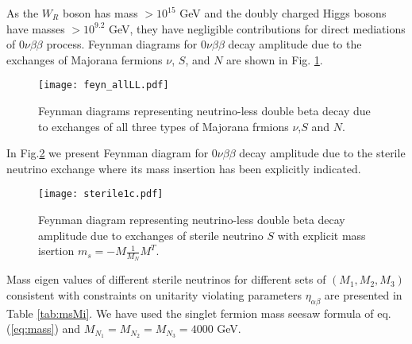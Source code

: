 \documentclass[a4paper,11pt]{article}
\begin{document}
As the $W_R$ boson has mass $> 10^{15}$ GeV   and the doubly charged Higgs bosons
have masses $> 10^{9.2}$ GeV, they have negligible contributions for direct mediations of $0\nu\beta\beta$ process.
 Feynman diagrams for
$0\nu\beta\beta$ decay amplitude due to the exchanges of Majorana
fermions $\nu$, $S$, and $N$ are shown in Fig. \ref{fig:feynall}.
\begin{figure}[htbp]
 \texttt{[image: feyn\_allLL.pdf]}
 \caption{Feynman diagrams representing neutrino-less double beta
   decay due to
exchanges of all three types of  Majorana frmions $\nu$,$S$ and $N$.}   
\label{fig:feynall}
\end{figure}
In Fig.\ref{fig:feyns} we present  Feynman diagram for
$0\nu\beta\beta$ decay amplitude due to the sterile neutrino  exchange 
where its mass insertion has been explicitly indicated.
\begin{figure}[htbp]
 \texttt{[image: sterile1c.pdf]}
 \caption{Feynman diagram representing neutrino-less double beta
   decay amplitude due to
exchanges of sterile neutrino $S$ with explicit mass isertion $m_s=-M\frac{1}{M_N}M^T$.}   
\label{fig:feyns}
\end{figure}
Mass eigen values of different sterile neutrinos for different sets of 
 $(M_1,M_2,M_3)$ consistent  with constraints on unitarity violating parameters 
$\eta_{\alpha \beta}$ are presented in Table \ref{tab:msMi}. We have
used the singlet fermion  mass seesaw formula of eq.(\ref{eq:mass})
and $M_{N_1}=M_{N_2}=M_{N_3}= 4000$ GeV. 
\end{document}
